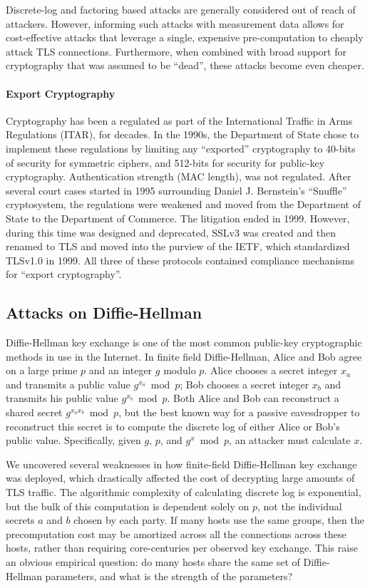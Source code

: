 Discrete-log and factoring based attacks are generally considered out of reach
of attackers.  However, informing such attacks with measurement data allows for
cost-effective attacks that leverage a single, expensive pre-computation to
cheaply attack TLS connections. Furthermore, when combined with broad support
for cryptography that was assumed to be “dead”, these attacks become even
cheaper.



\paragraph{Export Cryptography}
Cryptography has been a regulated as part of the International Traffic in Arms
Regulations (ITAR), for decades. In the 1990s, the Department of State chose to
implement these regulations by limiting any ``exported'' cryptography to
40-bits of security for symmetric ciphers, and 512-bits for security for
public-key cryptography. Authentication strength (\eg MAC length), was not
regulated. After several court cases started in 1995 surrounding Daniel J.
Bernstein's ``Snuffle'' cryptosystem, the regulations were weakened and moved
from the Department of State to the Department of Commerce. The litigation
ended in 1999. However, during this time \ssltwo was designed and deprecated,
SSLv3 was created and then renamed to TLS and moved into the purview of the
IETF, which standardized TLSv1.0 in 1999. All three of these protocols
contained compliance mechanisms for ``export cryptography''.

\subsection{Attacks on Diffie-Hellman}

Diffie-Hellman key exchange is one of the most common public-key
cryptographic methods in use in the Internet. In finite field Diffie-Hellman,
Alice and Bob agree on a large prime $p$ and an integer $g$ modulo $p$. Alice
chooses a secret integer $x_a$ and transmits a public value $g^{x_a} \bmod
p$; Bob chooses a secret integer $x_b$ and transmits his public value
$g^{x_b} \bmod p$. Both Alice and Bob can reconstruct a shared secret $g^{x_a
x_b} \bmod p$, but the best known way for a passive eavesdropper to
reconstruct this secret is to compute the discrete log of either Alice or
Bob's public value. Specifically, given $g$, $p$, and $g^x \bmod p$, an
attacker must calculate $x$.

We uncovered several weaknesses in how finite-field Diffie-Hellman key
exchange was deployed, which drastically affected the cost of decrypting
large amounts of TLS traffic. The algorithmic complexity of calculating
discrete log is exponential, but the bulk of this computation is dependent
solely on $p$, not the individual secrets $a$ and $b$ chosen by each party.
If many hosts use the same groups, then the precomputation cost may be
amortized across all the connections across these hosts, rather than
requiring core-centuries per observed key exchange. This raise an obvious
empirical question: do many hosts share the same set of Diffie-Hellman
parameters, and what is the strength of the parameters?

